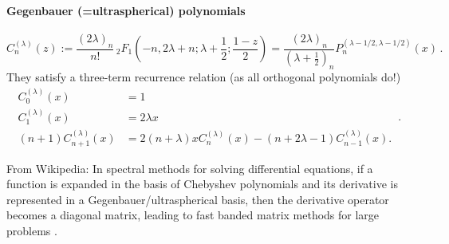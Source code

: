 \paragraph{Gegenbauer (=ultraspherical) polynomials}
$$C_{n}^{{( \lambda )}}(z) := {\frac  {(2\lambda )_{n}}{n!}}\,_{2}F_{1}\left(-n,2\lambda +n;\lambda +{\frac  {1}{2}};{\frac  {1-z}{2}}\right) = {\frac  {(2\lambda )_{n}}{(\lambda +{\frac  {1}{2}})_{{n}}}}P_{n}^{{(\lambda -1/2,\lambda -1/2)}}(x)\,.$$
They satisfy a three-term recurrence relation (as all orthogonal polynomials do!)
$${ {\begin{aligned}C_{0}^{(\lambda )}(x)&=1\\C_{1}^{(\lambda )}(x)&=2\lambda x\\(n+1)C_{n+1}^{(\lambda )}(x)&=2(n+\lambda )xC_{n}^{(\lambda )}(x)-(n+2\lambda -1)C_{n-1}^{(\lambda )}(x).\end{aligned}}}\,.$$

From Wikipedia: In spectral methods for solving differential equations, if a function is expanded in the basis of Chebyshev polynomials and its derivative is represented in a Gegenbauer/ultraspherical basis, then the derivative operator becomes a diagonal matrix, leading to fast banded matrix methods for large problems \parencite{2013-a-fast-and-well-conditioned-spectral-method}.
